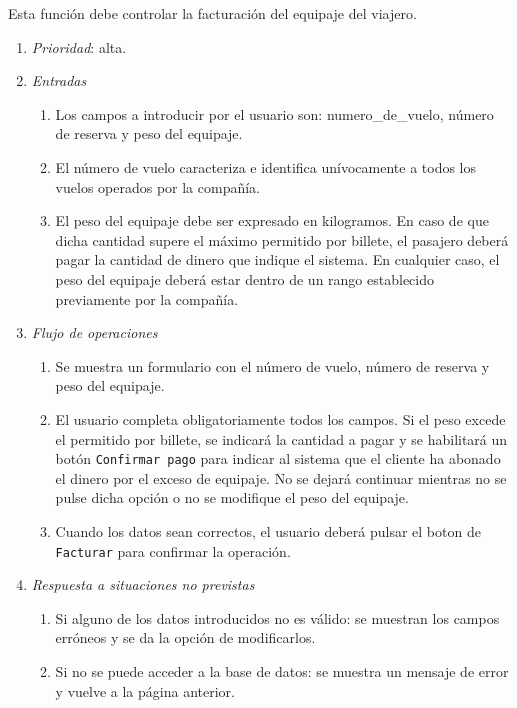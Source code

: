 	Esta función debe controlar la facturación del equipaje del viajero.

	\begin{enumerate}
		\item \textit{Prioridad}: alta.
		\item \textit{Entradas}
			\begin{enumerate}
				\item Los campos a introducir por el usuario son: \gls{numero_de_vuelo}, número de reserva y peso del equipaje.
				\item El número de vuelo caracteriza e identifica unívocamente a todos los vuelos operados por la compañía.
				\item El peso del equipaje debe ser expresado en kilogramos. En caso de que dicha cantidad supere el máximo permitido por billete, el pasajero deberá pagar la cantidad de dinero que indique el sistema. En cualquier caso, el peso del equipaje deberá estar dentro de un rango establecido previamente por la compañía.
			\end{enumerate}
		\item \textit{Flujo de operaciones}
			\begin{enumerate}
				\item Se muestra un formulario con el número de vuelo, número de reserva y peso del equipaje.
				\item El usuario completa obligatoriamente todos los campos. Si el peso excede el permitido por billete, se indicará la cantidad a pagar y se habilitará un botón \verb|Confirmar pago| para indicar al sistema que el cliente ha abonado el dinero por el exceso de equipaje. No se dejará continuar mientras no se pulse dicha opción o no se modifique el peso del equipaje.
				\item Cuando los datos sean correctos, el usuario deberá pulsar el boton de \verb|Facturar| para confirmar la operación.
			\end{enumerate}
		\item \textit{Respuesta a situaciones no previstas}
			\begin{enumerate}
				\item Si alguno de los datos introducidos no es válido: se muestran los campos erróneos y se da la opción de modificarlos.
				\item Si no se puede acceder a la base de datos: se muestra un mensaje de error y vuelve a la página anterior.
			\end{enumerate}
	\end{enumerate}	
